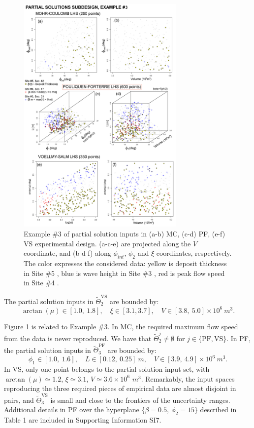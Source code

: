 \documentclass[nhess, manuscript]{copernicus}
\begin{document}
\begin{figure}[H]
\centering
\includegraphics[width=0.73\textwidth]{Fig11_PF.png}
\caption{Example \#3 of partial solution inputs in (a-b) MC, (c-d) PF, (e-f) VS experimental design. (a-c-e) are projected along the $V$ coordinate, and (b-d-f) along $\phi_{int}$, $\phi_2$ and $\xi$ coordinates, respectively. The color expresses the considered data: yellow is deposit thickness in Site \#5 \citep{Saucedo2008}, blue is wave height in Site \#3 \citep{PonceSegura1983}, red is peak flow speed in Site \#4 \citep{Pierson1985}.}
\label{Fig11a}
\end{figure}

The partial solution inputs in $\tilde\Theta_2^{\textrm{VS}}$ are bounded by:
$$\arctan(\mu) \in [1.0,\ 1.8],\quad \xi\in[3.1, 3.7],\quad V \in [3.8,\ 5.0] \times 10^6\ m^3.$$

Figure \ref{Fig11a} is related to Example \#3. In MC, the required maximum flow speed from the data is never reproduced. We have that $\tilde\Theta_2^j\neq\emptyset$ for $j\in\{\textrm{PF}, \textrm{VS}\}$. In PF, the partial solution inputs in $\tilde\Theta_3^{\textrm{PF}}$ are bounded by:
$$\phi_1 \in [1.0,\ 1.6],\quad L \in [0.12,\ 0.25]\ m,\quad V \in [3.9,\ 4.9] \times 10^6\ m^3.$$
In VS, only one point belongs to the partial solution input set, with $\arctan(\mu) \simeq 1.2$, $\xi \simeq 3.1$, $V \simeq 3.6 \times 10^6$ $m^3$. Remarkably, the input spaces reproducing the three required pieces of empirical data are almost disjoint in pairs, and $\tilde\Theta_3^{\textrm{VS}}$ is small and close to the frontiers of the uncertainty ranges. Additional details in PF over the hyperplane $\{\beta=0.5,\ \phi_2=15\}$ described in Table 1 are included in Supporting Information SI7.
\end{document}
